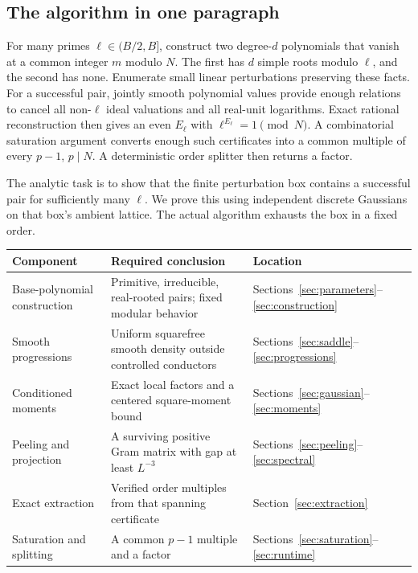 \subsection{The algorithm in one paragraph}

For many primes \(\ell\in(B/2,B]\), construct two degree-\(d\) polynomials
that vanish at a common integer \(m\) modulo \(N\).  The first has \(d\)
simple roots modulo \(\ell\), and the second has none.  Enumerate small
linear perturbations preserving these facts.  For a successful pair,
jointly smooth polynomial values provide enough relations to cancel
all non-\(\ell\) ideal valuations and all real-unit logarithms.  Exact
rational reconstruction then gives an even \(E_\ell\) with
\(\ell^{E_\ell}=1\pmod N\).  A combinatorial saturation argument converts
enough such certificates into a common multiple of every \(p-1\),
\(p\mid N\).  A deterministic order splitter then returns a factor.

The analytic task is to show that the finite perturbation box contains
a successful pair for sufficiently many \(\ell\).  We prove this using
independent discrete Gaussians on that box's ambient lattice.  The actual
algorithm exhausts the box in a fixed order.

\begin{center}
\begin{tabular}{p{}p{}p{}}
\toprule
Component & Required conclusion & Location \\
\midrule
Base-polynomial construction & Primitive, irreducible, real-rooted pairs;
fixed modular behavior & Sections~\ref{sec:parameters}--\ref{sec:construction} \\
Smooth progressions & Uniform squarefree smooth density outside controlled
conductors & Sections~\ref{sec:saddle}--\ref{sec:progressions} \\
Conditioned moments & Exact local factors and a centered square-moment bound
& Sections~\ref{sec:gaussian}--\ref{sec:moments} \\
Peeling and projection & A surviving positive Gram matrix with gap
at least \(L^{-3}\) & Sections~\ref{sec:peeling}--\ref{sec:spectral} \\
Exact extraction & Verified order multiples from that spanning certificate
& Section~\ref{sec:extraction} \\
Saturation and splitting & A common \(p-1\) multiple and a factor
& Sections~\ref{sec:saturation}--\ref{sec:runtime} \\
\bottomrule
\end{tabular}
\end{center}

